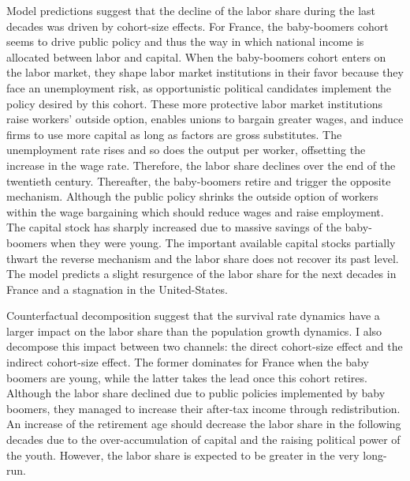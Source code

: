 \documentclass[
]{article}
\begin{document}
Model predictions suggest that the decline of the labor share during the last decades was driven by cohort-size effects.
For France, the baby-boomers cohort seems to drive public policy and thus the way in which national income is allocated between labor and capital.
When the baby-boomers cohort enters on the labor market, they shape labor market institutions in their favor because they face an unemployment risk, as opportunistic political candidates implement the policy desired by this cohort.
These more protective labor market institutions raise workers' outside option, enables unions to bargain greater wages, and induce firms to use more capital as long as factors are gross substitutes.
The unemployment rate rises and so does the output per worker, offsetting the increase in the wage rate.
Therefore, the labor share declines over the end of the twentieth century.
Thereafter, the baby-boomers retire and trigger the opposite mechanism.
Although the public policy shrinks the outside option of workers within the wage bargaining which should reduce wages and raise employment.
The capital stock has sharply increased due to massive savings of the baby-boomers when they were young.
The important available capital stocks partially thwart the reverse mechanism and the labor share does not recover its past level.
The model predicts a slight resurgence of the labor share for the next decades in France and a stagnation in the United-States.

Counterfactual decomposition suggest that the survival rate dynamics have a larger impact on the labor share than the population growth dynamics. I also decompose this impact between two channels: the direct cohort-size effect and the indirect cohort-size effect. The former dominates for France when the baby boomers are young, while the latter takes the lead once this cohort retires. Although the labor share declined due to public policies implemented by baby boomers, they managed to increase their after-tax income through redistribution. An increase of the retirement age should decrease the labor share in the following decades due to the over-accumulation of capital and the raising political power of the youth. However, the labor share is expected to be greater in the very long-run.
\end{document}
